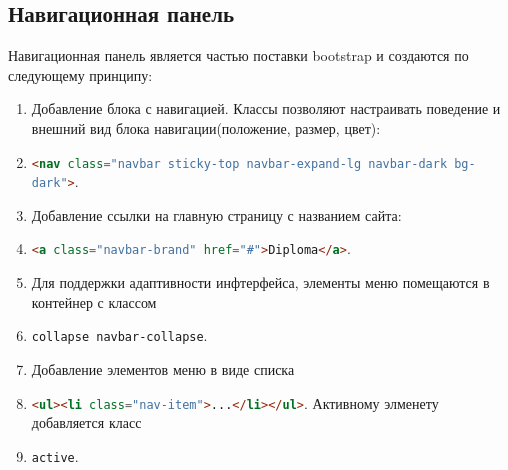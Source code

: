 \subsection{Навигационная панель}
Навигационная панель является частью поставки bootstrap и создаются по следующему принципу:
\begin{enumerate}
	\item Добавление блока с навигацией. Классы позволяют настраивать поведение и внешний вид блока навигации(положение, размер, цвет): \item \lstinline[language=HTML]{<nav class="navbar sticky-top navbar-expand-lg navbar-dark bg-dark">}.
	\item Добавление ссылки на главную страницу с названием сайта: \item \lstinline[language=HTML]{<a class="navbar-brand" href="#">Diploma</a>}.
	\item Для поддержки адаптивности инфтерфейса, элементы меню помещаются в контейнер с классом \item \lstinline[language=HTML]{collapse navbar-collapse}.
	\item Добавление элементов меню в виде списка \item \lstinline[language=HTML]{<ul><li class="nav-item">...</li></ul>}. Активному элменету добавляется класс \item \lstinline[language=HTML]{active}.
\end{enumerate}